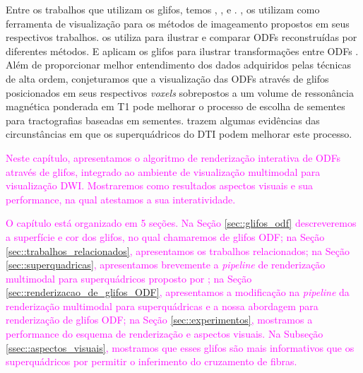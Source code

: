 \documentclass[
    12pt,                %
    oneside,            %
    a4paper,            %
    english,            %
    french,                %
    spanish,            %
    brazil                %
    ]{abntex2}
\begin{document}
Entre os trabalhos que utilizam os glifos, temos ,  ,    e  . ,   os utilizam como ferramenta de visualização para os métodos de imageamento propostos em seus respectivos trabalhos.  os utiliza para ilustrar e comparar ODFs reconstruídas por diferentes métodos. E  aplicam os glifos  para ilustrar transformações entre ODFs . 
Além de proporcionar melhor entendimento dos dados adquiridos pelas técnicas de alta ordem, conjeturamos que a visualização das ODFs através de glifos posicionados em seus respectivos \textit{voxels} sobrepostos a um volume de ressonância magnética ponderada em T1 pode melhorar o processo de escolha de sementes para tractografias baseadas em sementes.  trazem algumas evidências das circunstâncias em que os superquádricos do DTI podem melhorar este processo.


\textcolor{magenta}{
Neste capítulo, apresentamos o algoritmo de renderização interativa de ODFs através de glifos, integrado ao ambiente de visualização multimodal para visualização DWI. Mostraremos como resultados aspectos visuais e sua performance, na qual atestamos a sua interatividade.
}

\textcolor{magenta}{O capítulo está organizado em 5 seções. Na Seção \ref{sec::glifos_odf} descreveremos a superfície e cor dos glifos, no qual chamaremos de glifos ODF; na Seção \ref{sec::trabalhos_relacionados}, apresentamos os trabalhos relacionados; na Seção \ref{sec::superquadricas}, apresentamos brevemente a \textit{pipeline} de renderização multimodal para superquádricos proposto por ; na Seção \ref{sec::renderizacao_de_glifos_ODF}, apresentamos a modificação na \textit{pipeline} da renderização multimodal para superquádricas e a nossa abordagem para renderização de glifos ODF; na Seção \ref{sec::experimentos}, mostramos a performance do esquema de renderização e aspectos visuais.
}
\textcolor{magenta}{
Na Subseção \ref{ssec::aspectos_visuais}, mostramos que esses glifos são mais informativos que os superquádricos por permitir o inferimento do cruzamento de fibras.
}
\end{document}
